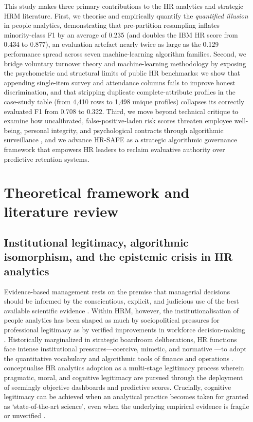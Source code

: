 \documentclass[12pt,a4paper]{article}
\begin{document}
This study makes three primary contributions to the HR analytics and strategic HRM literature. First, we theorise and empirically quantify the \textit{quantified illusion} in people analytics, demonstrating that pre-partition resampling inflates minority-class F1 by an average of 0.235 (and doubles the IBM HR score from 0.434 to 0.877), an evaluation artefact nearly twice as large as the 0.129 performance spread across seven machine-learning algorithm families. Second, we bridge voluntary turnover theory and machine-learning methodology by exposing the psychometric and structural limits of public HR benchmarks: we show that appending single-item survey and attendance columns fails to improve honest discrimination, and that stripping duplicate complete-attribute profiles in the case-study table (from 4,410 rows to 1,498 unique profiles) collapses its correctly evaluated F1 from 0.708 to 0.322. Third, we move beyond technical critique to examine how uncalibrated, false-positive-laden risk scores threaten employee well-being, personal integrity, and psychological contracts through algorithmic surveillance \parencite{ref61,ref60}, and we advance HR-SAFE as a strategic algorithmic governance framework that empowers HR leaders to reclaim evaluative authority over predictive retention systems.

\section{Theoretical framework and literature review}
\subsection{Institutional legitimacy, algorithmic isomorphism, and the epistemic crisis in HR analytics}
\label{sec:people-analytics}
Evidence-based management rests on the premise that managerial decisions should be informed by the conscientious, explicit, and judicious use of the best available scientific evidence \parencite{ref43}. Within HRM, however, the institutionalisation of people analytics has been shaped as much by sociopolitical pressures for professional legitimacy as by verified improvements in workforce decision-making \parencite{ref50,ref44,ref51}. Historically marginalized in strategic boardroom deliberations, HR functions face intense institutional pressures---coercive, mimetic, and normative \parencite{ref59}---to adopt the quantitative vocabulary and algorithmic tools of finance and operations \parencite{ref50,ref56}. \textcite{ref51} conceptualise HR analytics adoption as a multi-stage legitimacy process wherein pragmatic, moral, and cognitive legitimacy are pursued through the deployment of seemingly objective dashboards and predictive scores. Crucially, cognitive legitimacy can be achieved when an analytical practice becomes taken for granted as `state-of-the-art science', even when the underlying empirical evidence is fragile or unverified \parencite{ref44,ref52}.
\end{document}
